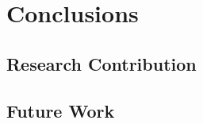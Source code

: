 \section{Conclusions}
\label{sec:conclusion}

\subsection{Research Contribution} %
\label{sub:research_contribution}



\subsection{Future Work} %
\label{sub:future_work}

